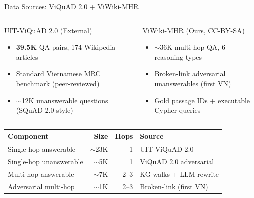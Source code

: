 \documentclass[aspectratio=169]{beamer}
\newcommand{\HL}[1]{\textcolor{emphasis}{#1}}
\begin{document}
\begin{frame}{Data Sources: ViQuAD 2.0 + ViWiki-MHR}
\begin{columns}[T]
\begin{alertblock}{UIT-ViQuAD 2.0 (External)}
\begin{itemize}
  \item \textbf{39.5K} QA pairs, 174 Wikipedia articles
  \item Standard Vietnamese MRC benchmark (peer-reviewed)
  \item $\sim$12K unanswerable questions (SQuAD 2.0 style)
\end{itemize}
\end{alertblock}

\begin{exampleblock}{ViWiki-MHR (Ours, CC-BY-SA)}
\begin{itemize}
  \item $\sim$36K multi-hop QA, 6 reasoning types
  \item Broken-link adversarial unanswerables (first VN)
  \item Gold passage IDs + executable Cypher queries
\end{itemize}
\end{exampleblock}
\end{columns}
\vspace{0.3em}
\begin{center}
\small
\begin{tabular}{lrrl}
\toprule
\textbf{Component} & \textbf{Size} & \textbf{Hops} & \textbf{Source} \\
\midrule
Single-hop answerable & $\sim$23K & 1 & UIT-ViQuAD 2.0 \\
Single-hop unanswerable & $\sim$5K & 1 & ViQuAD 2.0 adversarial \\
Multi-hop answerable & $\sim$7K & 2--3 & KG walks + LLM rewrite \\
\HL{Adversarial multi-hop} & $\sim$1K & 2--3 & \HL{Broken-link (first VN)} \\
\bottomrule
\end{tabular}
\end{center}
\end{frame}
\end{document}

